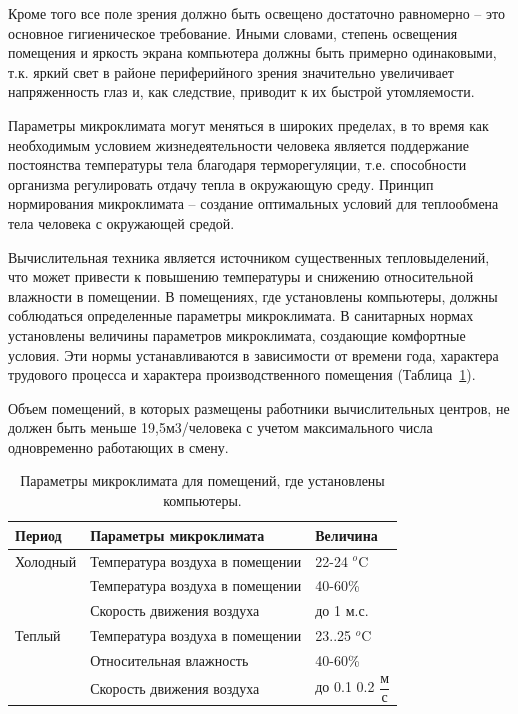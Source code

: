 \documentclass[14pt,a4paper]{reportmod}
\begin{document}
Кроме того все поле зрения должно быть освещено достаточно равномерно – это основное гигиеническое требование. Иными словами, степень освещения помещения и яркость экрана компьютера должны быть примерно одинаковыми, т.к. яркий свет в районе периферийного зрения значительно увеличивает напряженность глаз и, как следствие, приводит к их быстрой утомляемости.


Параметры микроклимата могут меняться в широких пределах, в то время как необходимым условием жизнедеятельности человека является поддержание постоянства температуры тела благодаря терморегуляции, т.е. способности организма регулировать отдачу тепла в окружающую среду. Принцип нормирования микроклимата – создание оптимальных условий для теплообмена тела человека с окружающей средой.


Вычислительная техника является источником существенных тепловыделений, что может привести к повышению температуры и снижению относительной влажности в помещении. В помещениях, где установлены компьютеры, должны соблюдаться определенные параметры микроклимата. В санитарных нормах  установлены величины параметров микроклимата, создающие комфортные условия. Эти нормы устанавливаются в зависимости от времени года, характера трудового процесса и характера производственного помещения (Таблица~\ref{tabl:ohrana2}).

Объем помещений, в которых размещены работники вычислительных центров, не должен быть меньше 19,5м3/человека с учетом максимального числа одновременно работающих в смену.

\begin{table}
  \centering
  \caption{Параметры микроклимата для помещений, где установлены компьютеры.}
  \label{tabl:ohrana2}
  \begin{tabularx}{\textwidth}{|X|X|X|}
    \hline
    {\bfseries Период} &
    {\bfseries Параметры микроклимата} &
    {\bfseries Величина} \\
    \hline
    Холодный & Температура воздуха в помещении & 22-24 $^o$C\\
    \hline
     & Температура воздуха в помещении & 40-60\%\\
    \hline
     & Скорость движения воздуха & до 1 м.с.\\
    \hline
    Теплый & Температура воздуха в помещении & 23..25 $^o$C\\
    \hline
     & Относительная влажность & 40-60\%\\
    \hline
     & Скорость движения воздуха & до 0.1 0.2 $\dfrac{м}{с}$\\
    \hline
  \end{tabularx}
\end{table}
\end{document}
